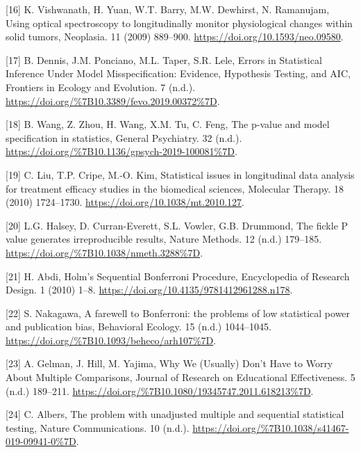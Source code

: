 \documentclass[
]{article}
\begin{document}
\leavevmode\hypertarget{ref-vishwanath2009}{}%
{[}16{]} K. Vishwanath, H. Yuan, W.T. Barry, M.W. Dewhirst, N. Ramanujam, Using optical spectroscopy to longitudinally monitor physiological changes within solid tumors, Neoplasia. 11 (2009) 889--900. \url{https://doi.org/10.1593/neo.09580}.

\leavevmode\hypertarget{ref-dennis2019}{}%
{[}17{]} B. Dennis, J.M. Ponciano, M.L. Taper, S.R. Lele, Errors in Statistical Inference Under Model Misspecification: Evidence, Hypothesis Testing, and AIC, Frontiers in Ecology and Evolution. 7 (n.d.). \url{https://doi.org/\%7B10.3389/fevo.2019.00372\%7D}.

\leavevmode\hypertarget{ref-wang2019}{}%
{[}18{]} B. Wang, Z. Zhou, H. Wang, X.M. Tu, C. Feng, The p-value and model specification in statistics, General Psychiatry. 32 (n.d.). \url{https://doi.org/\%7B10.1136/gpsych-2019-100081\%7D}.

\leavevmode\hypertarget{ref-liu2010}{}%
{[}19{]} C. Liu, T.P. Cripe, M.-O. Kim, Statistical issues in longitudinal data analysis for treatment efficacy studies in the biomedical sciences, Molecular Therapy. 18 (2010) 1724--1730. \url{https://doi.org/10.1038/mt.2010.127}.

\leavevmode\hypertarget{ref-halsey2015}{}%
{[}20{]} L.G. Halsey, D. Curran-Everett, S.L. Vowler, G.B. Drummond, The fickle P value generates irreproducible results, Nature Methods. 12 (n.d.) 179--185. \url{https://doi.org/\%7B10.1038/nmeth.3288\%7D}.

\leavevmode\hypertarget{ref-abdi2010}{}%
{[}21{]} H. Abdi, Holm's Sequential Bonferroni Procedure, Encyclopedia of Research Design. 1 (2010) 1--8. \url{https://doi.org/10.4135/9781412961288.n178}.

\leavevmode\hypertarget{ref-nakagawa2004}{}%
{[}22{]} S. Nakagawa, A farewell to Bonferroni: the problems of low statistical power and publication bias, Behavioral Ecology. 15 (n.d.) 1044--1045. \url{https://doi.org/\%7B10.1093/beheco/arh107\%7D}.

\leavevmode\hypertarget{ref-gelman2012}{}%
{[}23{]} A. Gelman, J. Hill, M. Yajima, Why We (Usually) Don't Have to Worry About Multiple Comparisons, Journal of Research on Educational Effectiveness. 5 (n.d.) 189--211. \url{https://doi.org/\%7B10.1080/19345747.2011.618213\%7D}.

\leavevmode\hypertarget{ref-albers2019}{}%
{[}24{]} C. Albers, The problem with unadjusted multiple and sequential statistical testing, Nature Communications. 10 (n.d.). \url{https://doi.org/\%7B10.1038/s41467-019-09941-0\%7D}.
\end{document}
